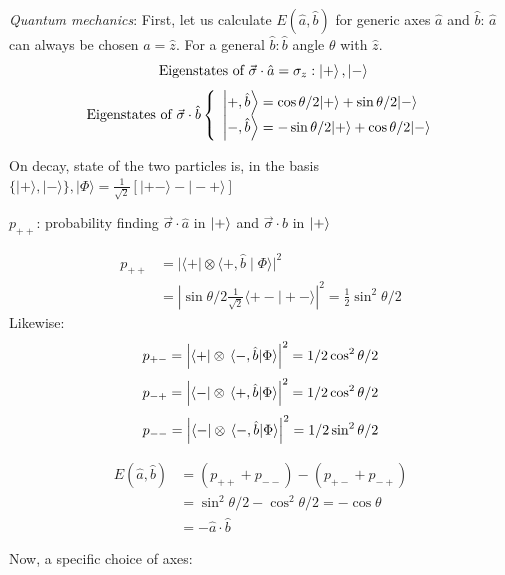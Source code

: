 \documentclass[12pt]{article}
\newcommand{\be}{\begin{equation}}
\newcommand{\ee}{\end{equation}}
\begin{document}
\emph{Quantum mechanics}: First, let us calculate \(E(\hat{a}, \hat{b})\)
for generic axes $\hat{a}$ and $\hat{b}$: $\hat{a}$ can always be chosen
$\hat{a}=\hat{z}$. For a general $\hat{b}: \hat{b}$ angle $\theta$ with $\hat{z}$.
\be
\text { Eigenstates of } \vec{\sigma} \cdot \hat{a}=\sigma_{z}: \ket{+},\ket{-}
\ee
\be
\text { Eigenstates of } \vec{\sigma} \cdot \hat{b}\left\{
\begin{array}{l}
\ket{+, \hat{b}}= \cos \theta / 2|+\rangle+\sin \theta / 2|-\rangle \\ 
\ket{-, \hat{b}}=-\sin \theta / 2|+\rangle+\cos \theta / 2|-\rangle
\end{array}\right.
\ee

On decay, state of the two particles is, in the basis
\(\{|+\rangle,|-\rangle\},|\Phi\rangle=\frac{1}{\sqrt{2}}[|+-\rangle-|-+\rangle]\)

\(p_{++}\): probability finding 
\(\vec{\sigma} \cdot \hat{a}\) in \(\ket{+}\) and 
\(\vec{\sigma} \cdot \hat{b}\) in \(\ket{+}\)

\be
\begin{aligned} 
p_{++} 
&=|\langle+|\otimes\langle +, \hat{b} \mid \Phi\rangle|^{2}\\ 
&=\left|\sin \theta / 2 \frac{1}{\sqrt{2}}\langle+-\mid+-\rangle\right|^{2}=
\frac{1}{2} \sin ^{2} \theta / 2 
\end{aligned}
\ee
Likewise:
\be
p_{+-} = \left|\bra{+}\otimes\bra*{-,\hat{b}}\ket*{\Phi}\right|^2 = 1/2\cos^2\theta/2
\ee
\be
p_{-+} = \left|\bra{-}\otimes\bra*{+,\hat{b}}\ket*{\Phi}\right|^2 = 1/2\cos^2\theta/2
\ee
\be
p_{--} = \left|\bra{-}\otimes\bra*{-,\hat{b}}\ket*{\Phi}\right|^2 = 1/2\sin^2\theta/2
\ee

\be
\begin{aligned} 
E\left(\hat{a}, \hat{b}\right) 
&=\left(p_{++}+p_{--}\right)-\left(p_{+-}+p_{-+}\right) \\
&=\sin ^{2} \theta / 2-\cos ^{2} \theta / 2=-\cos \theta \\ 
&=-\hat{a} \cdot \hat{b} 
\end{aligned}
\ee

Now, a specific choice of axes:
\end{document}
